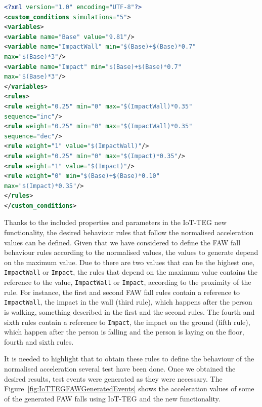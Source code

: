 \documentclass[review]{elsarticle}
\begin{document}
\begin{lstlisting}[basicstyle=\ttfamily\footnotesize,language=XML,caption={Rules to define a FAW fall},label=FAWFallRules]
<?xml version="1.0" encoding="UTF-8"?>
<custom_conditions simulations="5">
<variables>
<variable name="Base" value="9.81"/>
<variable name="ImpactWall" min="$(Base)+$(Base)*0.7" 
max="$(Base)*3"/>
<variable name="Impact" min="$(Base)+$(Base)*0.7" 
max="$(Base)*3"/>
</variables>
<rules>
<rule weight="0.25" min="0" max="$(ImpactWall)*0.35" 
sequence="inc"/>
<rule weight="0.25" min="0" max="$(ImpactWall)*0.35" 
sequence="dec"/>
<rule weight="1" value="$(ImpactWall)"/>
<rule weight="0.25" min="0" max="$(Impact)*0.35"/>
<rule weight="1" value="$(Impact)"/>
<rule weight="0" min="$(Base)+$(Base)*0.10"
max="$(Impact)*0.35"/>
</rules>
</custom_conditions>
\end{lstlisting}

Thanks to the included properties and parameters in the IoT-TEG new functionality, the desired behaviour rules that
follow the normalised acceleration values can be defined. Given that we have considered to define the FAW fall behaviour
rules according to the normalised values, the values to generate depend on the maximum value. Due to there are two 
values that can be the highest one, \texttt{ImpactWall} or \texttt{Impact}, the rules that depend on the maximum 
value contains the reference to the value, \texttt{ImpactWall} or \texttt{Impact}, according to the proximity
of the rule. For instance, the first and second FAW fall rules contain a reference to \texttt{ImpactWall}, the impact 
in the wall (third rule), which happens after the person is walking, something described in the first and the second rules.
The fourth and sixth rules contain a reference to \texttt{Impact}, the impact on the ground (fifth rule), which happen
after the person is falling and the person is laying on the floor, fourth and sixth rules.

It is needed to highlight that to obtain these rules to define the behaviour of the normalised acceleration several test have been done. Once we obtained the desired results, test events were generated as they were necessary. The Figure~\ref{fig:IoTTEGFAWGeneratedEvents} shows the acceleration values of some of the generated FAW falls using IoT-TEG and the new functionality.
\end{document}
